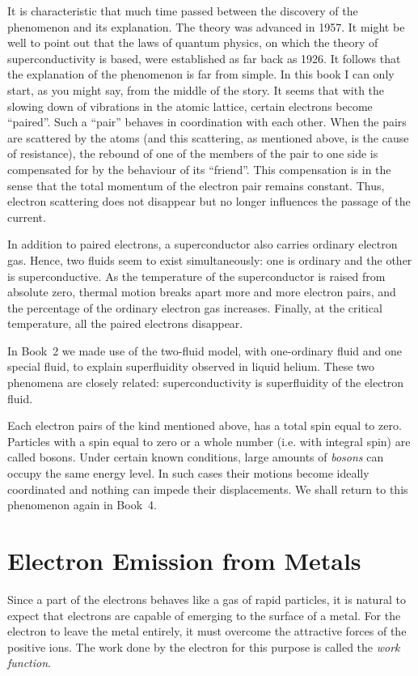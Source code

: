 It is characteristic that much time passed between the discovery of the phenomenon and its explanation. The theory was advanced in 1957. It might be well to point out that the laws of quantum physics, on which the theory of superconductivity is based, were established as far back as 1926. It follows that the explanation of the phenomenon is far from simple. In this book I can only start, as you might say, from the middle of the story. It seems that with the slowing down of vibrations in the atomic lattice, certain electrons become ``paired''. Such a ``pair'' behaves in coordination with each other. When the pairs are scattered by the atoms (and this scattering, as mentioned above, is the cause of resistance), the rebound of one of the members of the pair to one side is compensated for by the behaviour of its ``friend''. This compensation is in the sense that the total momentum of the electron pair remains constant. Thus, electron scattering does not disappear but no longer influences the passage of the current.

In addition to paired electrons, a superconductor also carries ordinary electron gas. Hence, two fluids seem to exist simultaneously: one is ordinary and the other is superconductive. As the temperature of the superconductor is raised from absolute zero, thermal motion breaks apart more and more electron pairs, and the percentage of the ordinary electron gas increases. Finally, at the critical temperature, all the paired electrons disappear.

In Book~2 we made use of the two-fluid model, with one-ordinary fluid and one special fluid, to explain superfluidity observed in liquid helium. These two phenomena are closely related: superconductivity is superfluidity of the electron fluid.

Each electron pairs of the kind mentioned above, has a total spin equal to zero. Particles with a spin equal to zero or a whole number (i.e. with integral spin) are called bosons. Under certain known conditions, large amounts of \emph{bosons} can occupy the same energy level. In such cases their motions become ideally coordinated and nothing can impede their displacements. We shall return to this phenomenon again in Book~4.

\section{Electron Emission from Metals}
Since a part of the electrons behaves like a gas of rapid particles, it is natural to expect that electrons are capable of emerging to the surface of a metal. For the electron to leave the metal entirely, it must overcome the attractive forces of the positive ions. The work done by the electron for this purpose is called the \emph{work function}.


